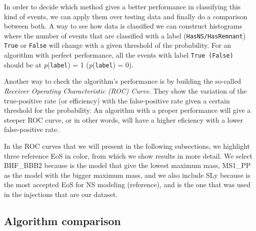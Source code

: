 
%


In order to decide which method gives a better performance in classifying this kind of events, we can apply them over testing data and finally do a comparison between both. A way to see how data is classified we can construct histograms where the number of events that are classified with a label (\texttt{HasNS/HasRemnant}) \texttt{True} or \texttt{False} will change with a given threshold of the probability. For an algorithm with perfect performance, all the events with label \texttt{True (False)} should be at \textit{p}(\texttt{label}) = 1 (\textit{p}(\texttt{label}) = 0).

Another way to check the algorithm's performance is by building the so-called \textit{Receiver Operating Characteristic (ROC) Curve}. They show the variation of the true-positive rate (or efficiency) with the false-positive rate given a certain threshold for the probability. An algorithm with a proper performance will give a steeper ROC curve, or in other words, will have a higher eficiency with a lower false-positive rate.  


In the ROC curves that we will present in the following subsections, we highlight three reference EoS in color, from which we show results in more detail. We select BHF\_BBB2 because is the model that give the lowest maximum mass, MS1\_PP as the model with the bigger maximum mass, and we also include SLy because is the most accepted EoS for NS modeling (reference), and is the one that was used in the injections that are our dataset.


\subsection{Algorithm comparison}




